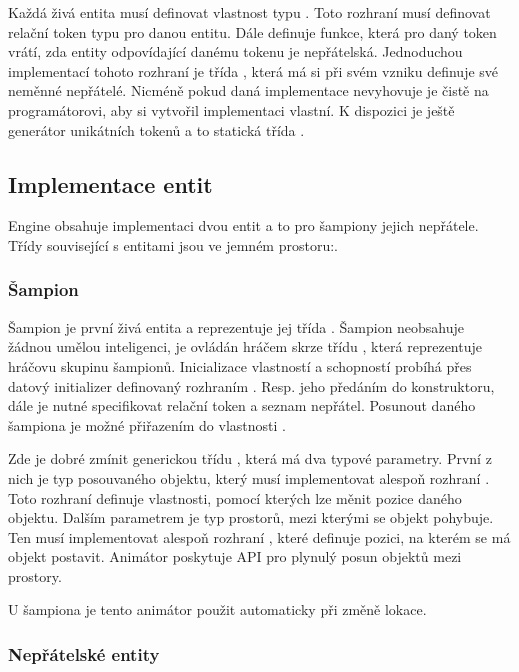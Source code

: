 Každá živá entita musí definovat vlastnost typu . Toto rozhraní musí definovat relační token typu
 pro danou entitu. Dále definuje funkce, která pro daný token vrátí, zda entity odpovídající danému 
tokenu je nepřátelská. Jednoduchou implementací tohoto rozhraní je třída , která má
si při svém vzniku definuje své neměnné nepřátelé. Nicméně pokud daná implementace nevyhovuje je čistě na programátorovi,
aby si vytvořil implementaci vlastní. K dispozici je ještě generátor unikátních tokenů a to statická třída .

\subsection{Implementace entit}
Engine obsahuje implementaci dvou entit a to pro šampiony jejich nepřátele.
Třídy související s entitami jsou ve jemném prostoru:\newline {}.


\subsubsection{Šampion}
Šampion je první živá
entita a reprezentuje jej třída . Šampion neobsahuje žádnou umělou inteligenci, je ovládán hráčem skrze
třídu , která reprezentuje hráčovu skupinu šampionů. Inicializace vlastností a schopností probíhá přes
datový initializer definovaný rozhraním . Resp. jeho předáním do konstruktoru, dále je nutné
specifikovat relační token a seznam nepřátel. Posunout daného šampiona je možné přiřazením do vlastnosti .

Zde je dobré zmínit generickou třídu , která má dva typové parametry. První z nich je typ posouvaného 
objektu, který musí implementovat alespoň rozhraní . Toto  rozhraní definuje vlastnosti, pomocí kterých lze měnit
pozice daného objektu. Dalším parametrem je typ prostorů, mezi kterými se objekt pohybuje. Ten musí implementovat alespoň 
rozhraní , které definuje pozici, na kterém se má objekt postavit. Animátor poskytuje API pro plynulý
posun objektů mezi prostory.

U šampiona je tento animátor použit automaticky při změně lokace.

\subsubsection{Nepřátelské entity}


